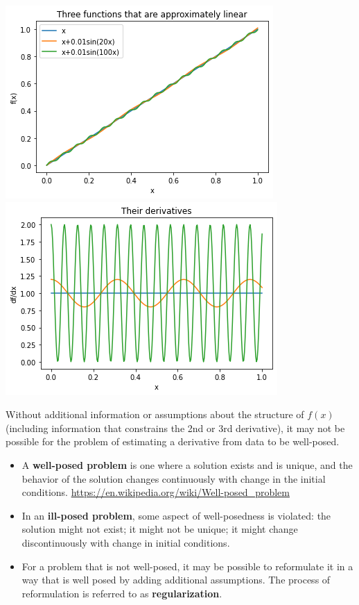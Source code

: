 \documentclass[12pt,letterpaper,noanswers]{exam}
\begin{document}
\includegraphics[width = 0.45\linewidth]{img/Class11lines.png}
\includegraphics[width = 0.45\linewidth]{img/Class11linederiv.png}


\begin{tcolorbox}

Without additional information or assumptions about the structure of $f(x)$ (including information that constrains the 2nd or 3rd derivative), it may not be possible for the problem of estimating a derivative from data to be well-posed.

\begin{itemize}
\itemsep0pt
    \item A \textbf{well-posed problem} is one where a solution exists and is unique, and the behavior of the solution changes continuously with change in the initial conditions.  \url{https://en.wikipedia.org/wiki/Well-posed_problem}
    \item In an \textbf{ill-posed problem}, some aspect of well-posedness is violated: the solution might not exist; it might not be unique; it might change discontinuously with change in initial conditions.
    \item For a problem that is not well-posed, it may be possible to reformulate it in a way that is well posed by adding additional assumptions.  The process of reformulation is referred to as \textbf{regularization}.
\end{itemize}





 
\end{tcolorbox}
\end{document}
